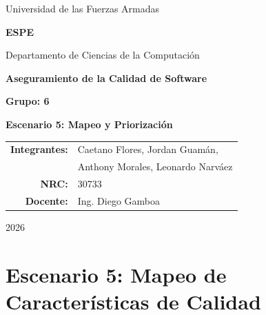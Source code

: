 \documentclass[11pt]{article}
\begin{document}
\begin{titlepage}
\centering
{\Large Universidad de las Fuerzas Armadas\par}
{\LARGE \textbf{ESPE}\par}
\vspace{0.35cm}
{\large Departamento de Ciencias de la Computación\par}
\vspace{1.5cm}
{\Large \textbf{Aseguramiento de la Calidad de Software}\par}
\vspace{0.5cm}
{\large \textbf{Grupo: 6}\par}
\vspace{1.2cm}
{\Large \textbf{Escenario 5: Mapeo y Priorización}\par}
\vfill
\begin{tabular}{rl}
\textbf{Integrantes:} & Caetano Flores, Jordan Guamán,\\
& Anthony Morales, Leonardo Narváez\\
\textbf{NRC:} & 30733\\
\textbf{Docente:} & Ing. Diego Gamboa\\
\end{tabular}
\vfill
{\large 2026\par}
\end{titlepage}

\section*{Escenario 5: Mapeo de Características de Calidad}
\end{document}
